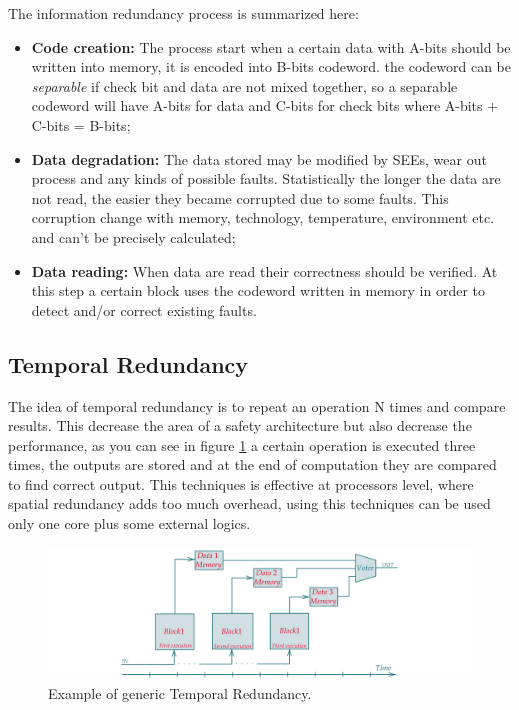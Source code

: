 {{{		    The information redundancy process is summarized here:
		    \begin{itemize}
		        \item \textbf{Code creation:} The process start when a certain data with A-bits should be written into memory, it is encoded into B-bits codeword. the codeword can be \textit{separable} if check bit and data are not mixed together, so a separable codeword will have A-bits for data and C-bits for check bits where A-bits + C-bits = B-bits;
		        \item \textbf{Data degradation:} The data stored may be modified by SEEs, wear out process and any kinds of possible faults. Statistically the longer the data are not read, the easier they became corrupted due to some faults. This corruption change with memory, technology, temperature, environment etc. and can't be precisely calculated;
		        \item \textbf{Data reading:} When data are read their correctness should be verified. At this step a certain block uses the codeword written in memory in order to detect and/or correct existing faults.
		    \end{itemize}
		    
		    
		}
		\subsection{Temporal Redundancy}{
			The idea of temporal redundancy is to repeat an operation N times and compare results. 
			This decrease the area of a safety architecture but also decrease the performance, as you can see in figure \ref{fig:TemporalRedundancy1} a certain operation is executed three times, the outputs are stored and at the end of computation they are compared to find correct output. 
			This techniques is effective at processors level, where spatial redundancy adds too much overhead, using this techniques can be used only one core plus some external logics.\\
			
			\begin{figure}[H]
    			\centering
    			\includegraphics[scale=0.2,center]{./images/TimeRedundancy1.png}
    			\caption{Example of generic Temporal Redundancy.}
    			\label{fig:TemporalRedundancy1}
    		\end{figure} 
    		
}}}
